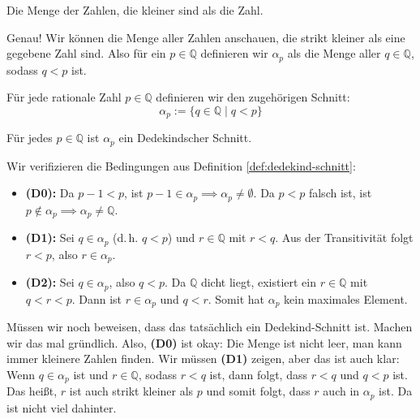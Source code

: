 \begin{student-interaction}
Die Menge der Zahlen, die kleiner sind als die Zahl.
\end{student-interaction}

\begin{spoken-clean}[00:30:50 - 00:33:24]
Genau! Wir können die Menge aller Zahlen anschauen, die strikt kleiner als eine gegebene Zahl sind. Also für ein $p \in \mathbb{Q}$ definieren wir $\alpha_p$ als die Menge aller $q \in \mathbb{Q}$, sodass $q < p$ ist.
\end{spoken-clean}

\begin{math-stroke}
Für jede rationale Zahl $p \in \mathbb{Q}$ definieren wir den zugehörigen Schnitt:
\begin{equation}
\label{eq:rational-cut}
\alpha_p := \{ q \in \mathbb{Q} \mid q < p \}
\end{equation}

\begin{claim}\label{clm:alpha-p-is-cut}
Für jedes $p \in \mathbb{Q}$ ist $\alpha_p$ ein Dedekindscher Schnitt.
\end{claim}

\begin{short-proof}
Wir verifizieren die Bedingungen aus Definition \ref{def:dedekind-schnitt}:
\begin{itemize}
    \item \textbf{(D0):} Da $p-1 < p$, ist $p-1 \in \alpha_p \implies \alpha_p \neq \emptyset$. Da $p < p$ falsch ist, ist $p \notin \alpha_p \implies \alpha_p \neq \mathbb{Q}$.
    \item \textbf{(D1):} Sei $q \in \alpha_p$ (d.\,h. $q < p$) und $r \in \mathbb{Q}$ mit $r < q$. Aus der Transitivität folgt $r < p$, also $r \in \alpha_p$.
    \item \textbf{(D2):} Sei $q \in \alpha_p$, also $q < p$. Da $\mathbb{Q}$ dicht liegt, existiert ein $r \in \mathbb{Q}$ mit $q < r < p$. Dann ist $r \in \alpha_p$ und $q < r$. Somit hat $\alpha_p$ kein maximales Element.
\end{itemize}
\end{short-proof}
\end{math-stroke}

\begin{spoken-clean}[00:33:24 - 00:35:23]
Müssen wir noch beweisen, dass das tatsächlich ein Dedekind-Schnitt ist. Machen wir das mal gründlich. Also, \textbf{(D0)} ist okay: Die Menge ist nicht leer, man kann immer kleinere Zahlen finden. Wir müssen \textbf{(D1)} zeigen, aber das ist auch klar: Wenn $q \in \alpha_p$ ist und $r \in \mathbb{Q}$, sodass $r < q$ ist, dann folgt, dass $r < q$ und $q < p$ ist. Das heißt, $r$ ist auch strikt kleiner als $p$ und somit folgt, dass $r$ auch in $\alpha_p$ ist. Da ist nicht viel dahinter.
\end{spoken-clean}

